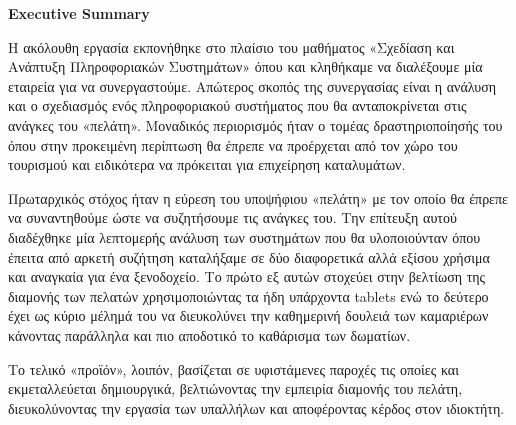 \noindent
\textbf{Εxecutive Summary}\\

\noindent

Η ακόλουθη εργασία εκπονήθηκε στο πλαίσιο του μαθήματος «Σχεδίαση και 
Ανάπτυξη Πληροφοριακών Συστημάτων» όπου και κληθήκαμε να διαλέξουμε 
μία εταιρεία για να συνεργαστούμε. Απώτερος σκοπός της συνεργασίας είναι η
ανάλυση και ο σχεδιασμός ενός πληροφοριακού συστήματος που θα 
ανταποκρίνεται στις ανάγκες του «πελάτη». Μοναδικός περιορισμός ήταν ο 
τομέας δραστηριοποίησής του όπου στην προκειμένη περίπτωση θα έπρεπε 
να προέρχεται από τον χώρο του τουρισμού και ειδικότερα να πρόκειται για 
επιχείρηση καταλυμάτων.\\

\noindent


Πρωταρχικός στόχος ήταν η εύρεση του υποψήφιου 
«πελάτη» με τον οποίο θα έπρεπε να συναντηθούμε ώστε να συζητήσουμε τις 
ανάγκες του. Την επίτευξη αυτού διαδέχθηκε μία λεπτομερής ανάλυση των 
συστημάτων που θα υλοποιούνταν όπου έπειτα από αρκετή συζήτηση 
καταλήξαμε σε δύο διαφορετικά αλλά εξίσου χρήσιμα και αναγκαία για ένα 
ξενοδοχείο. Το πρώτο εξ αυτών στοχεύει στην βελτίωση της διαμονής των 
πελατών χρησιμοποιώντας τα ήδη υπάρχοντα tablets ενώ το δεύτερο έχει ως 
κύριο μέλημά του να διευκολύνει την καθημερινή δουλειά των καμαριέρων 
κάνοντας παράλληλα και πιο αποδοτικό το καθάρισμα των δωματίων.\\

\noindent

Το τελικό «προϊόν», λοιπόν, βασίζεται σε υφιστάμενες παροχές τις οποίες και 
εκμεταλλεύεται δημιουργικά, βελτιώνοντας την εμπειρία διαμονής του πελάτη, 
διευκολύνοντας την εργασία των υπαλλήλων και αποφέροντας κέρδος στον
ιδιοκτήτη. 